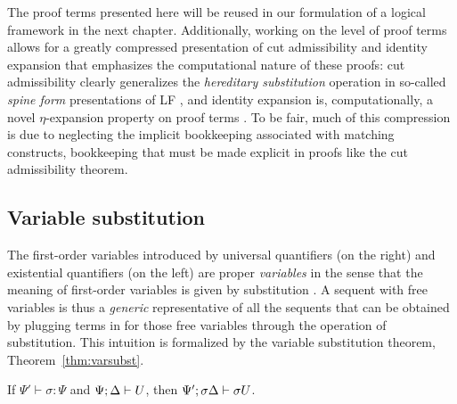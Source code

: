The proof terms presented here will be reused in our formulation of a
logical framework in the next chapter.  Additionally, working on the
level of proof terms allows for a greatly compressed presentation of
cut admissibility and identity expansion that emphasizes the
computational nature of these proofs: cut admissibility clearly
generalizes the {\it hereditary substitution} operation in so-called {\it
  spine form} presentations of LF \cite{cervesato02linear}, and
identity expansion is, computationally, a novel $\eta$-expansion
property on proof terms \cite{simmons11structural}.  To be fair, much
of this compression is due to neglecting the implicit bookkeeping
associated with matching constructs, bookkeeping that must be made
explicit in proofs like the cut admissibility theorem.

\subsection{Variable substitution}

The first-order variables introduced by universal quantifiers (on the
right) and existential quantifiers (on the left) are proper {\it
  variables} in the sense that the meaning of first-order variables is
given by substitution \cite[Chapter 1]{harper12practical}. A sequent
with free variables is thus a {\it generic} representative of all the
sequents that can be obtained by plugging terms in for those free
variables through the operation of substitution. This intuition is
formalized by the variable substitution theorem,
Theorem~\ref{thm:varsubst}.

\bigskip
\begin{theorem}
\label{thm:varsubst}
If $\Psi' \vdash \sigma : \Psi$ and ${\Psi};{\Delta} \vdash {U}$, then 
${\Psi'};{\sigma\Delta} \vdash {\sigma{U}}$.
\end{theorem}

